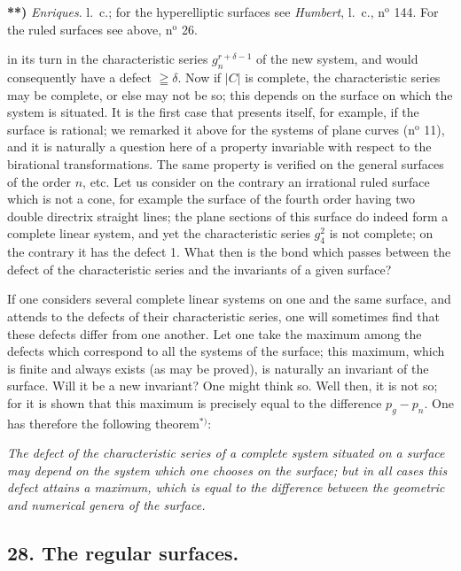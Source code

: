 \documentclass{article}
\begin{document}
\textbf{**)} \emph{Enriques}. l.\ c.; for the hyperelliptic surfaces see \emph{Humbert}, l.\ c., n${}^{\text{o}}$ 144. For the ruled surfaces see above, n${}^{\text{o}}$ 26.

in its turn in the characteristic series $g_{n}^{r+\delta-1}$ of the new system, and would consequently have a defect $\geqq \delta$. Now if $|C|$ is complete, the characteristic series may be complete, or else may not be so; this depends on the surface on which the system is situated. It is the first case that presents itself, for example, if the surface is rational; we remarked it above for the systems of plane curves (n${}^{\text{o}}$ 11), and it is naturally a question here of a property invariable with respect to the birational transformations. The same property is verified on the general surfaces of the order $n$, etc. Let us consider on the contrary an irrational ruled surface which is not a cone, for example the surface of the fourth order having two double directrix straight lines; the plane sections of this surface do indeed form a complete linear system, and yet the characteristic series $g_{4}^{2}$ is not complete; on the contrary it has the defect 1. What then is the bond which passes between the defect of the characteristic series and the invariants of a given surface?

If one considers several complete linear systems on one and the same surface, and attends to the defects of their characteristic series, one will sometimes find that these defects differ from one another. Let one take the maximum among the defects which correspond to all the systems of the surface; this maximum, which is finite and always exists (as may be proved), is naturally an invariant of the surface. Will it be a new invariant? One might think so. Well then, it is not so; for it is shown that this maximum is precisely equal to the difference $p_{g} - p_{n}$. One has therefore the following theorem${}^{*)}$:

\emph{The defect of the characteristic series of a complete system situated on a surface may depend on the system which one chooses on the surface; but in all cases this defect attains a maximum, which is equal to the difference between the geometric and numerical genera of the surface.}

\subsection*{28. The regular surfaces.}
\end{document}
